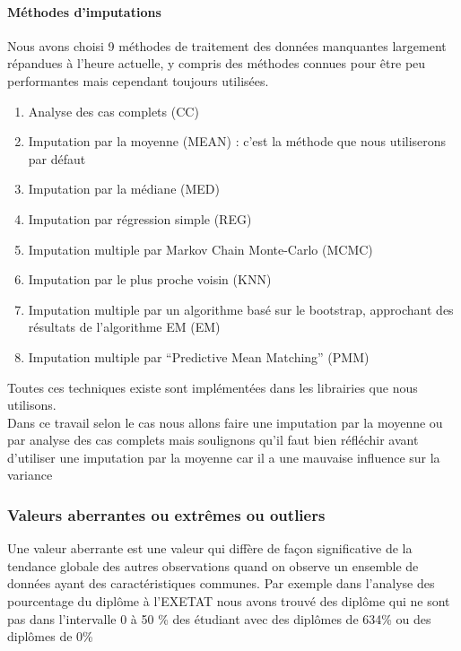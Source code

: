 \paragraph{Méthodes d'imputations} 

Nous avons choisi 9 méthodes de traitement des données manquantes
largement répandues à l'heure actuelle, y compris des méthodes connues
pour être peu performantes mais cependant toujours utilisées. 
\begin{enumerate}
	\item Analyse des cas complets (CC)
	\item Imputation par la moyenne (MEAN) : c'est la
	méthode que nous utiliserons par défaut
	\item Imputation par la médiane
	(MED)
	\item  Imputation par régression simple (REG)
	\item Imputation multiple par Markov Chain Monte-Carlo (MCMC)
	\item  Imputation par le plus proche
	voisin (KNN)
	\item Imputation multiple par un algorithme basé sur le
	bootstrap, approchant des résultats de l'algorithme EM (EM)
	\item Imputation multiple par ``Predictive Mean Matching'' (PMM)
\end{enumerate}
Toutes ces techniques existe sont implémentées dans les librairies que nous
utilisons.\\
Dans ce travail selon le cas nous allons faire une imputation par la
moyenne ou par analyse des cas complets mais soulignons qu'il faut bien
réfléchir avant d'utiliser une imputation par la moyenne car il a une
mauvaise influence sur la variance
\subsubsection{Valeurs aberrantes ou extrêmes ou outliers}
Une valeur aberrante est une valeur qui diffère de façon significative
de la tendance globale des autres observations quand on observe un
ensemble de données ayant des caractéristiques communes. Par exemple
dans l'analyse des pourcentage du diplôme à l'EXETAT nous avons trouvé
des diplôme qui ne sont pas dans l'intervalle 0 à 50 \% des étudiant
avec des diplômes de 634\% ou des diplômes de 0\%


